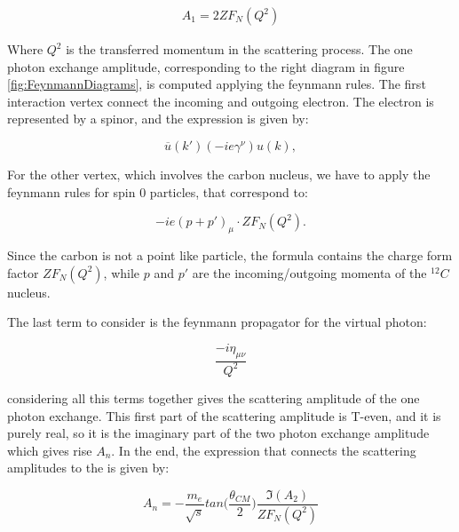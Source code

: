 \begin{align*}
A_{1} = 2Z F_{N}(Q^{2})
\end{align*} 

Where $Q^{2}$ is the transferred momentum in the scattering process. The one photon exchange amplitude, corresponding to the right diagram in figure \ref{fig:FeynmannDiagrams}, is computed applying the feynmann rules. The first interaction vertex connect the incoming and outgoing electron. The electron is represented by a spinor, and the expression is given by: 

\begin{equation}
\overline{u}(k') (-ie \gamma^{\nu}) u(k) ,
\end{equation} 

For the other vertex, which involves the carbon nucleus, we have to apply the feynmann rules for spin 0 particles, that correspond to:

\begin{equation}
-ie(p + p')_{\mu} \cdot Z F_{N}(Q^{2}).
\end{equation}

Since the carbon is not a point like particle, the formula contains the charge form factor $Z F_{N}(Q^{2})$, while $p$ and $p'$ are the incoming/outgoing momenta of the $^{12}C$ nucleus. 

The last term to consider is the feynmann propagator for the virtual photon:

\begin{equation}
\frac{-i \eta_{\mu \nu}}{Q^{2}}
\end{equation}

considering all this terms together gives the scattering amplitude of the one photon exchange. This first part of the scattering amplitude is T-even, and it is purely real, so it is the imaginary part of the two photon exchange amplitude which gives rise $A_{n}$. In the end, the expression that connects the scattering amplitudes to the \transv is given by:

\begin{equation} \label{eq:integral}
A_{n} = -\frac{m_{e}}{\sqrt{s}} tan \bigl (\frac{\theta_{CM}}{2} \bigl) \dfrac{\Im(A_{2})}{ZF_{N}(Q^{2})}
\end{equation}

